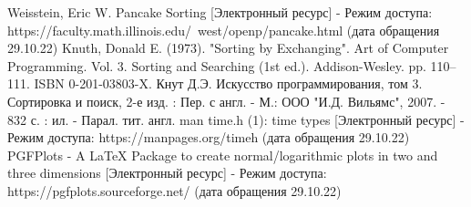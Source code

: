 \begin{thebibliography}{}
	 Weisstein, Eric W. Pancake Sorting [Электронный ресурс] - Режим доступа: https://faculty.math.illinois.edu/~west/openp/pancake.html (дата обращения 29.10.22)
	 Knuth, Donald E. (1973). "Sorting by Exchanging". Art of Computer Programming. Vol. 3. Sorting and Searching (1st ed.). Addison-Wesley. pp. 110–111. ISBN 0-201-03803-X.
	 Кнут Д.Э. Искусство программирования, том 3. Сортировка и поиск, 2-е изд. : Пер. с англ. - М.: ООО "И.Д. Вильямс", 2007. -  832 с. : ил.  - Парал. тит. англ.
	 man time.h (1): time types [Электронный ресурс] - Режим доступа: https://manpages.org/timeh (дата обращения 29.10.22)
	 PGFPlots - A LaTeX Package to create normal/logarithmic plots in two and three dimensions [Электронный ресурс] - Режим доступа: https://pgfplots.sourceforge.net/ (дата обращения 29.10.22)
\end{thebibliography}
